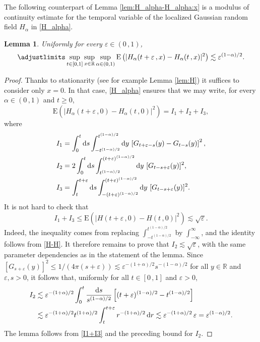 \documentclass[reqno]{amsart}
\newcommand{\<}{\langle}
\renewcommand{\>}{\rangle}
\newcommand{\R}{\mathbb{R}}
\newcommand{\E}{\mathrm{E}}
\newcommand{\1}{\mathbb{1}}
\renewcommand{\d}{{\rm d}}
\renewcommand{\ge}{\geqslant}
\renewcommand{\le}{\leqslant}
\newtheorem{lemma}[stat]{Lemma}
\theoremstyle{definition}
\numberwithin{equation}{section}
\begin{document}
The following counterpart of Lemma \ref{lem:H_alpha-H_alpha:x}
is a modulus of continuity estimate for the temporal variable of
the localized Gaussian random
field $H_\alpha$ in \eqref{H_alpha}.

\begin{lemma}\label{lem:H_alpha-H_alpha:t}
	Uniformly for every $\varepsilon\in(0\,,1)$,
	\[
		\adjustlimits\sup_{t\in[0,1]}\sup_{x\in\R}\sup_{\alpha\in(0,1)}
		\E\left(|H_\alpha(t+\varepsilon\,,x) - H_\alpha(t\,,x)|^2\right) 
		\lesssim \varepsilon^{(1-\alpha)/2}.
	\]
\end{lemma}

\begin{proof}
	Thanks to stationarity (see for example Lemma \ref{lem:H}) it suffices to consider
	only $x=0$. In that case, \eqref{H_alpha} ensures that
	we may write, for every $\alpha\in(0\,,1)$ and $t\ge0$,
	\[
		\E\left(|H_\alpha(t+\varepsilon\,,0) - H_\alpha(t\,,0)|^2\right) = I_1 + I_2 + I_3,
	\]
	where
	\begin{align*}
		I_1 &= \int_0^t\d s\int_{-t^{(1-\alpha)/2}}^{t^{(1-\alpha)/2}}\d y\,
			\left[ G_{t+\varepsilon-s}(y) - G_{t-s}(y)\right]^2,\\
		I_2 &= 2\int_0^t\d s\int_{t^{(1-\alpha)/2}}^{(t+\varepsilon)^{(1-\alpha)/2}}\d y\
			[G_{t-s+\varepsilon}(y)]^2,\\
		I_3 &= \int_t^{t+\varepsilon}\d s\int_{%
			-(t+\varepsilon)^{(1-\alpha)/2}}^{(t+\varepsilon)^{(1-\alpha)/2}}\d y\
			[G_{t-s+\varepsilon}(y)]^2.
	\end{align*}
	It is not hard to check that
	\begin{equation}\label{I1+I3}
		I_1+I_3 \le \E(|H(t+\varepsilon\,,0)-H(t\,,0)|^2) \lesssim \sqrt{\varepsilon}.
	\end{equation}
	Indeed, the inequality comes from replacing $\int_{-t^{(1-\alpha)/2}}^{t^{(1-\alpha)/2}}$
	by $\int_{-\infty}^\infty$, and the identity follows from \eqref{H-H}. 
	It therefore remains to prove that $I_2\lesssim\sqrt\varepsilon$,
	with the same parameter dependencies as in the statement of the lemma. 
	Since $[G_{s+\varepsilon}(y)]^2\le 1/(4\pi(s+\varepsilon)) 
	\lesssim \varepsilon^{-(1+\alpha)/2} s^{-(1-\alpha)/2}$
	for all $y\in\R$ and $\varepsilon,s>0$, it follows that,
	uniformly for all $t\in[0\,,1]$ and $\varepsilon>0$,
	\begin{align*}
		I_2 &\lesssim \varepsilon^{-(1+\alpha)/2}\int_0^t 
			\frac{\d s}{s^{(1-\alpha)/2} } \left[(t+\varepsilon)^{%
			(1-\alpha)/2}-t^{(1-\alpha)/2} \right]\\
			& \lesssim \varepsilon^{%
			-(1+\alpha)/2} t^{(1+\alpha)/2} \int_t^{t+\varepsilon} r^{-(1+\alpha)/2}\, \d r
		\lesssim  \varepsilon^{-(1+\alpha)/2}\,\varepsilon = \varepsilon^{(1-\alpha)/2}.
	\end{align*}
	The lemma follows from \eqref{I1+I3} and the preceding bound for $I_2$.
\end{proof}
\end{document}
